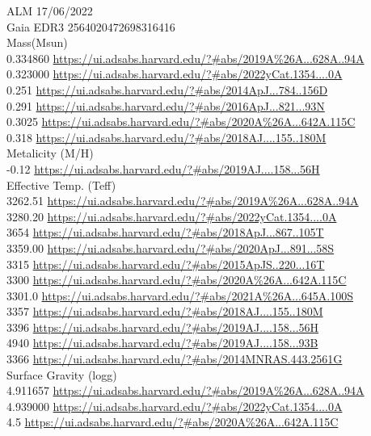 ALM 17/06/2022\\
Gaia EDR3 2564020472698316416\\
Mass(Msun)\\
0.334860 \url{https://ui.adsabs.harvard.edu/?#abs/2019A%26A...628A..94A}\\
0.323000 \url{https://ui.adsabs.harvard.edu/?#abs/2022yCat.1354....0A}\\
0.251 \url{https://ui.adsabs.harvard.edu/?#abs/2014ApJ...784..156D}\\
0.291 \url{https://ui.adsabs.harvard.edu/?#abs/2016ApJ...821...93N}\\
0.3025 \url{https://ui.adsabs.harvard.edu/?#abs/2020A%26A...642A.115C}\\
0.318 \url{https://ui.adsabs.harvard.edu/?#abs/2018AJ....155..180M}\\
Metalicity (M/H)\\
-0.12 \url{https://ui.adsabs.harvard.edu/?#abs/2019AJ....158...56H}\\
Effective Temp. (Teff)\\
3262.51 \url{https://ui.adsabs.harvard.edu/?#abs/2019A%26A...628A..94A}\\
3280.20 \url{https://ui.adsabs.harvard.edu/?#abs/2022yCat.1354....0A}\\
3654 \url{https://ui.adsabs.harvard.edu/?#abs/2018ApJ...867..105T}\\
3359.00 \url{https://ui.adsabs.harvard.edu/?#abs/2020ApJ...891...58S}\\
3315 \url{https://ui.adsabs.harvard.edu/?#abs/2015ApJS..220...16T}\\
3300 \url{https://ui.adsabs.harvard.edu/?#abs/2020A%26A...642A.115C}\\
3301.0 \url{https://ui.adsabs.harvard.edu/?#abs/2021A%26A...645A.100S}\\
3357 \url{https://ui.adsabs.harvard.edu/?#abs/2018AJ....155..180M}\\
3396 \url{https://ui.adsabs.harvard.edu/?#abs/2019AJ....158...56H}\\
4940 \url{https://ui.adsabs.harvard.edu/?#abs/2019AJ....158...93B}\\
3366 \url{https://ui.adsabs.harvard.edu/?#abs/2014MNRAS.443.2561G}\\
Surface Gravity (logg)\\
4.911657 \url{https://ui.adsabs.harvard.edu/?#abs/2019A%26A...628A..94A}\\
4.939000 \url{https://ui.adsabs.harvard.edu/?#abs/2022yCat.1354....0A}\\
4.5 \url{https://ui.adsabs.harvard.edu/?#abs/2020A%26A...642A.115C}\\

